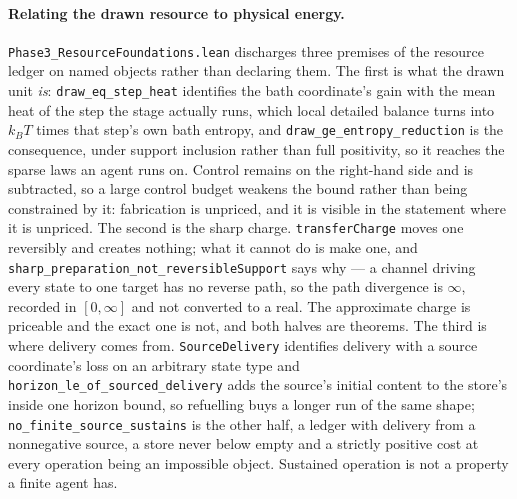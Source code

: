 \documentclass{article}
\begin{document}
\paragraph{Relating the drawn resource to physical energy.}
\nolinkurl{Phase3_ResourceFoundations.lean} discharges three premises
of the resource ledger on named objects rather than declaring them. The first is
what the drawn unit \emph{is}:
\nolinkurl{draw_eq_step_heat} identifies the
bath coordinate's gain with the mean heat of the step the stage actually runs,
which local detailed balance turns into $k_BT$ times that step's own bath
entropy, and \nolinkurl{draw_ge_entropy_reduction}
is the consequence, under support inclusion rather than full positivity, so it
reaches the sparse laws an agent runs on. Control remains on the right-hand side
and is subtracted, so a large control budget weakens the bound rather than being
constrained by it: fabrication is unpriced, and it is visible in the statement
where it is unpriced. The second is the sharp charge.
\texttt{transferCharge} moves one reversibly and creates nothing; what it cannot
do is make one, and
\nolinkurl{sharp_preparation_not_reversibleSupport}
says why --- a channel driving every state to one target has no reverse path, so
the path divergence is $\infty$, recorded in $[0,\infty]$ and not converted to a
real. The approximate charge is priceable and the exact one is not, and both
halves are theorems. The third is where delivery comes from.
\texttt{SourceDelivery} identifies delivery with a source coordinate's loss on
an arbitrary state type and
\nolinkurl{horizon_le_of_sourced_delivery}
adds the source's initial content to the store's inside one horizon bound, so
refuelling buys a longer run of the same shape;
\nolinkurl{no_finite_source_sustains} is the
other half, a ledger with delivery from a nonnegative source, a store never
below empty and a strictly positive cost at every operation being an impossible
object. Sustained operation is not a property a finite agent has.
\end{document}

